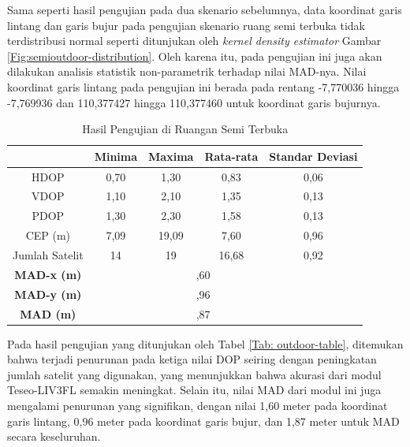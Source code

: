 Sama seperti hasil pengujian pada dua skenario sebelumnya, data koordinat garis lintang dan garis bujur pada pengujian skenario ruang semi terbuka tidak terdistribusi normal seperti ditunjukan oleh \textit{kernel density estimator} Gambar \ref{Fig:semioutdoor-distribution}. Oleh karena itu, pada pengujian ini juga akan dilakukan analisis statistik non-parametrik terhadap nilai MAD-nya. Nilai koordinat garis lintang pada pengujian ini berada pada rentang -7,770036 hingga -7,769936 dan 110,377427 hingga 110,377460 untuk koordinat garis bujurnya.

\begin{table}[H]
	\caption{Hasil Pengujian di Ruangan Semi Terbuka}
	\vspace{0.5em}
	\centering
	\begin{tabular}{ccccc}
		\hline
		& \textbf{Minima} & \textbf{Maxima} & \textbf{Rata-rata} & \textbf{Standar Deviasi}\\
		\hline 
		HDOP & 0,70 & 1,30 & 0,83 & 0,06\\
		VDOP & 1,10	& 2,10 & 1,35 & 0,13\\
		PDOP & 1,30	& 2,30 & 1,58 & 0,13\\
		CEP (m) & 7,09	& 19,09 & 7,60 & 0,96\\
		Jumlah Satelit & 14 & 19 & 16,68 & 0,92\\
		\hline
		\textbf{MAD-x (m)} & & \multicolumn{2}{c}{\centering 1,60} & \\
		\hline
		\textbf{MAD-y (m)} & & \multicolumn{2}{c}{\centering 0,96} & \\
		\hline
		\textbf{MAD (m)} & & \multicolumn{2}{c}{\centering 1,87} & \\
		\hline
	\end{tabular}
	\label{Tab: semioutdoor-table}
\end{table}

Pada hasil pengujian yang ditunjukan oleh Tabel \ref{Tab: outdoor-table}, ditemukan bahwa terjadi penurunan pada ketiga nilai DOP seiring dengan peningkatan jumlah satelit yang digunakan, yang menunjukkan bahwa akurasi dari modul Teseo\hyp{}LIV3FL semakin meningkat. Selain itu, nilai MAD dari modul ini juga mengalami penurunan yang signifikan, dengan nilai 1,60 meter pada koordinat garis lintang, 0,96 meter pada koordinat garis bujur, dan 1,87 meter untuk MAD secara keseluruhan.


